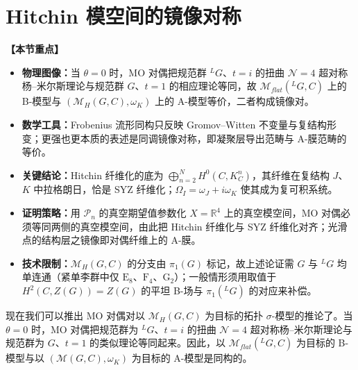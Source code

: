 \documentclass[11pt,a4paper,UTF8]{ctexart}
\newenvironment{keypoints}{%
  \par\addvspace{0.9em}%
  \noindent{\color{black!80}\rule{\linewidth}{0.6pt}}\par\nopagebreak\vspace{2pt}%
  \noindent\textbf{【本节重点】}\par\nopagebreak\vspace{2pt}%
  \begin{itemize}[leftmargin=1.6em,itemsep=1pt,topsep=2pt,parsep=0pt]%
}{%
  \end{itemize}\vspace{1pt}\noindent{\color{black!80}\rule{\linewidth}{0.6pt}}\par\addvspace{0.9em}%
}
\begin{document}
\section{Hitchin 模空间的镜像对称}

\begin{keypoints}
    \item \textbf{物理图像：}当 $\theta=0$ 时，MO 对偶把规范群 ${}^{L}G$、$t=i$ 的扭曲 $\mathcal{N}=4$ 超对称杨–米尔斯理论与规范群 $G$、$t=1$ 的相应理论等同，故 $\mathcal{M}_{flat}({}^{L}G,C)$ 上的 B-模型与 $(\mathcal{M}_{H}(G,C),\omega_{K})$ 上的 A-模型等价，二者构成镜像对。
    \item \textbf{数学工具：}Frobenius 流形同构只反映 Gromov–Witten 不变量与复结构形变；更强也更本质的表述是同调镜像对称，即凝聚层导出范畴与 A-膜范畴的等价。
    \item \textbf{关键结论：}Hitchin 纤维化的底为 $\bigoplus_{n=2}^{N}H^{0}(C,K_{C}^{n})$，其纤维在复结构 $J$、$K$ 中拉格朗日，恰是 SYZ 纤维化；$\Omega_{I}=\omega_{J}+i\omega_{K}$ 使其成为复可积系统。
    \item \textbf{证明策略：}用 $\mathcal{P}_{n}$ 的真空期望值参数化 $X=\mathbb{R}^{4}$ 上的真空模空间，MO 对偶必须等同两侧的真空模空间，由此把 Hitchin 纤维化与 SYZ 纤维化对齐；光滑点的结构层之镜像即对偶纤维上的 A-膜。
    \item \textbf{技术限制：}$\mathcal{M}_{H}(G,C)$ 的分支由 $\pi_{1}(G)$ 标记，故上述论证需 $G$ 与 ${}^{L}G$ 均单连通（紧单李群中仅 $\mathrm{E}_{8}$、$\mathrm{F}_{4}$、$\mathrm{G}_{2}$）；一般情形须用取值于 $H^{2}(C,Z(G))=Z(G)$ 的平坦 B-场与 $\pi_{1}({}^{L}G)$ 的对应来补偿。
\end{keypoints}

现在我们可以推出 MO 对偶对以 $\mathcal{M}_{H}(G,C)$ 为目标的拓扑 $\sigma$-模型的推论了。当 $\theta=0$ 时，MO 对偶把规范群为 ${}^{L}G$、$t=i$ 的扭曲 $\mathcal{N}=4$ 超对称杨–米尔斯理论与规范群为 $G$、$t=1$ 的类似理论等同起来。因此，以 $\mathcal{M}_{flat}({}^{L}G,C)$ 为目标的 B-模型与以 $(\mathcal{M}(G,C),\omega_{K})$ 为目标的 A-模型是同构的。


\end{document}
